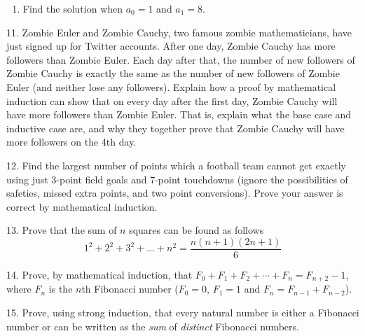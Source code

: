 \documentclass[10pt,]{book}
\theoremstyle{plain}
\theoremstyle{definition}
\theoremstyle{definition}
\theoremstyle{definition}
\numberwithin{equation}{chapter}
\begin{document}
\begin{exerciselist}
\begin{enumerate}[label=(\alph*)]
\item\hypertarget{li-1044}{}
                Find the solution when \(a_0 = 1\) and \(a_1 = 8\).


\end{enumerate}
\par\smallskip
\item[11.]\hypertarget{exercise-215}{}
            Zombie Euler and Zombie Cauchy, two famous zombie mathematicians, have just signed up for Twitter accounts. After one day, Zombie Cauchy has more followers than Zombie Euler. Each day after that, the number of new followers of Zombie Cauchy is exactly the same as the number of new followers of Zombie Euler (and neither lose any followers). Explain how a proof by mathematical induction can show that on every day after the first day, Zombie Cauchy will have more followers than Zombie Euler. That is, explain what the base case and inductive case are, and why they together prove that Zombie Cauchy will have more followers on the 4th day.
\par\smallskip
\item[12.]\hypertarget{exercise-216}{}
            Find the largest number of points which a football team cannot get exactly using just 3-point field goals and 7-point touchdowns (ignore the possibilities of safeties, missed extra points, and two point conversions). Prove your answer is correct by mathematical induction.
\par\smallskip
\item[13.]\hypertarget{exercise-217}{}
            Prove that the sum of \(n\) squares can be found as follows
            \begin{equation*}
              1^2 +2^2 +3^2+...+n^2 = \frac{n(n+1)(2n+1)}{6}
            \end{equation*}
\par\smallskip
\item[14.]\hypertarget{exercise-218}{}
            Prove, by mathematical induction, that \(F_0 + F_1 + F_2 + \cdots + F_{n} = F_{n+2} - 1\), where \(F_n\) is the \(n\)th Fibonacci number (\(F_0 = 0\), \(F_1 = 1\) and \(F_n = F_{n-1} + F_{n-2}\)).
\par\smallskip
\item[15.]\hypertarget{exercise-219}{}
            Prove, using strong induction, that every natural number is either a Fibonacci number or can be written as the \emph{sum} of \emph{distinct} Fibonacci numbers.
\par\smallskip
\end{exerciselist}
\typeout{************************************************}
\typeout{************************************************}
\end{document}
